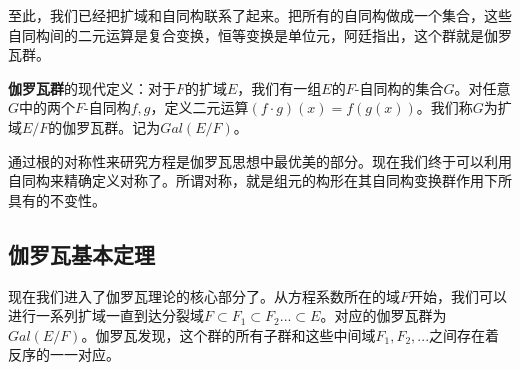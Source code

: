 \documentclass[b5paper]{ctexart}
\begin{document}
至此，我们已经把扩域和自同构联系了起来。把所有的自同构做成一个集合，这些自同构间的二元运算是复合变换，恒等变换是单位元，阿廷指出，这个群就是伽罗瓦群。

\begin{definition}
\textbf{伽罗瓦群}的现代定义：对于$F$的扩域$E$，我们有一组$E$的$F$-自同构的集合$G$。对任意$G$中的两个$F$-自同构$f, g$，定义二元运算$(f \cdot g)(x) = f(g(x))$。我们称$G$为扩域$E/F$的伽罗瓦群。记为$Gal(E/F)$。
\end{definition}

\begin{mdframed}
通过根的对称性来研究方程是伽罗瓦思想中最优美的部分。现在我们终于可以利用自同构来精确定义对称了。所谓对称，就是组元的构形在其自同构变换群作用下所具有的不变性。
\end{mdframed}

\begin{Exercise}
\end{Exercise}

\subsection{伽罗瓦基本定理}

现在我们进入了伽罗瓦理论的核心部分了。从方程系数所在的域$F$开始，我们可以进行一系列扩域一直到达分裂域$F \subset F_1 \subset F_2 ... \subset E$。对应的伽罗瓦群为$Gal(E/F)$。伽罗瓦发现，这个群的所有子群和这些中间域$F_1, F_2, ...$之间存在着反序的一一对应。
\end{document}
